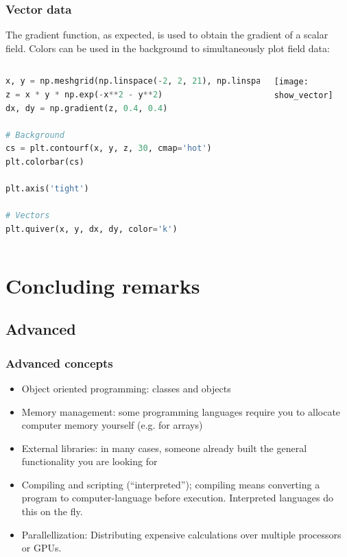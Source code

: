 \begin{frame}[fragile]
  \frametitle{Vector data}
  The gradient function, as expected, is used to obtain the gradient of a scalar field. Colors can be used in the background to simultaneously plot field data:
  \begin{columns}[T]
    \begin{lstlisting}[language=Python]
x, y = np.meshgrid(np.linspace(-2, 2, 21), np.linspace(-2, 2, 21))
z = x * y * np.exp(-x**2 - y**2)
dx, dy = np.gradient(z, 0.4, 0.4)

# Background
cs = plt.contourf(x, y, z, 30, cmap='hot')
plt.colorbar(cs)

plt.axis('tight')

# Vectors
plt.quiver(x, y, dx, dy, color='k')
    \end{lstlisting}
   \begin{center}
      \texttt{[image: show\_vector]}
    \end{center}
  \end{columns}
\end{frame}



\section{Concluding remarks}
\subsection*{Advanced}
\begin{frame}
  \frametitle{Advanced concepts}
  \begin{itemize}
    \item Object oriented programming: classes and objects
    \item Memory management: some programming languages require you to allocate computer memory yourself (e.g. for arrays)
    \item External libraries: in many cases, someone already built the general functionality you are looking for
    \item Compiling and scripting (``interpreted''); compiling means converting a program to computer-language before execution. Interpreted languages do this on the fly.
    \item Parallellization: Distributing expensive calculations over multiple processors or GPUs.
  \end{itemize}\pause
 \end{frame}

